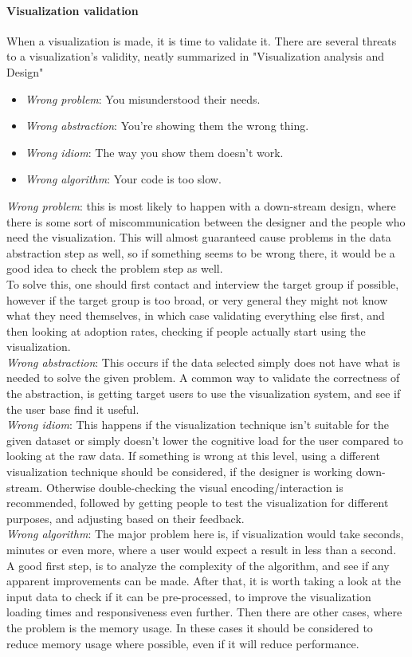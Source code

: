 \documentclass[Report.tex]{subfiles}
\begin{document}
	\paragraph{Visualization validation\\}
	When a visualization is made, it is time to validate it. There are several threats to a visualization's validity, neatly summarized in "Visualization analysis and Design" \cite[75]{Tamara}
	\begin{itemize}
		\item \emph{Wrong problem}: You misunderstood their needs.
		\item \emph{Wrong abstraction}: You're showing them the wrong thing.
		\item \emph{Wrong idiom}: The way you show them doesn't work.
		\item \emph{Wrong algorithm}: Your code is too slow.
	\end{itemize}
	\emph{Wrong problem}: this is most likely to happen with a down-stream design, where there is some sort of miscommunication between the designer and the people who need the visualization. This will almost guaranteed cause problems in the data abstraction step as well, so if something seems to be wrong there, it would be a good idea to check the problem step as well.\\
	To solve this, one should first contact and interview the target group if possible, however if the target group is too broad, or very general they might not know what they need themselves, in which case validating everything else first, and then looking at adoption rates, checking if people actually start using the visualization.\\
	\emph{Wrong abstraction}: This occurs if the data selected simply does not have what is needed to solve the given problem. A common way to validate the correctness of the abstraction, is getting target users to use the visualization system, and see if the user base find it useful.\\
	 \emph{Wrong idiom}: This happens if the visualization technique isn't suitable for the given dataset or simply doesn't lower the cognitive load for the user compared to looking at the raw data. If something is wrong at this level, using a different visualization technique should be considered, if the designer is working down-stream. Otherwise double-checking the visual encoding/interaction is recommended, followed by getting people to test the visualization for different purposes, and adjusting based on their feedback.\\
	 \emph{Wrong algorithm}: The major problem here is, if visualization would take seconds, minutes or even more, where a user would expect a result in less than a second. \\
	 A good first step, is to analyze the complexity of the algorithm, and see if any apparent improvements can be made. After that, it is worth taking a look at the input data to check if it can be pre-processed, to improve the visualization loading times and responsiveness even further. Then there are other cases, where the problem is the memory usage. In these cases it should be considered to reduce memory usage where possible, even if it will reduce performance.
\end{document}
